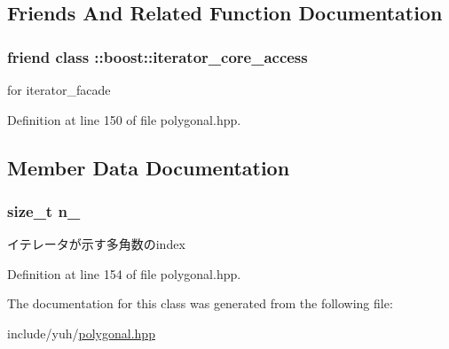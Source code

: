 \subsection{\-Friends \-And \-Related \-Function \-Documentation}
\hypertarget{classyuh_1_1range__detail_1_1polygonal__iterator_a986bf0deaa7559f361d03122eeea4c86}{
\subsubsection[{\-::boost\-::iterator\-\_\-core\-\_\-access}]{\setlength{\rightskip}{0pt plus 5cm}friend class \-::boost\-::iterator\-\_\-core\-\_\-access}}\label{d9/d0c/classyuh_1_1range__detail_1_1polygonal__iterator_a986bf0deaa7559f361d03122eeea4c86}
for iterator\-\_\-facade 

\-Definition at line 150 of file polygonal.\-hpp.



\subsection{\-Member \-Data \-Documentation}
\hypertarget{classyuh_1_1range__detail_1_1polygonal__iterator_a27fd4ef0d3621da512b437dbe4210464}{
\subsubsection[{n\-\_\-}]{\setlength{\rightskip}{0pt plus 5cm}size\-\_\-t {\bf n\-\_\-}}}\label{d9/d0c/classyuh_1_1range__detail_1_1polygonal__iterator_a27fd4ef0d3621da512b437dbe4210464}
イテレータが示す多角数のindex 

\-Definition at line 154 of file polygonal.\-hpp.



\-The documentation for this class was generated from the following file\-:\begin{DoxyCompactItemize}
\item 
include/yuh/\hyperlink{polygonal_8hpp}{polygonal.\-hpp}\end{DoxyCompactItemize}
